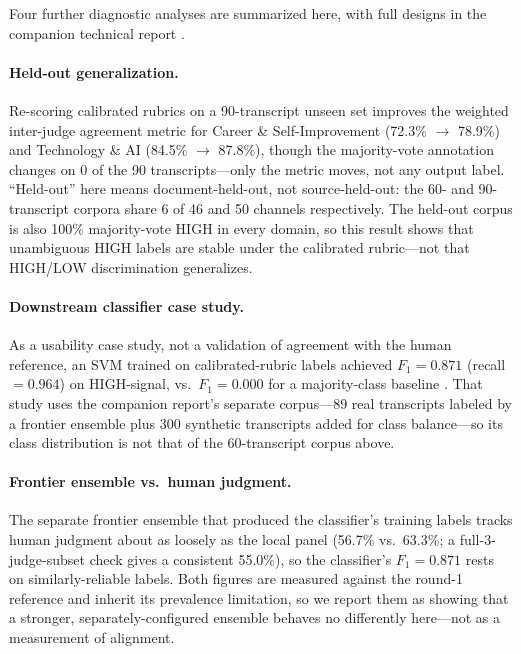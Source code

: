 \documentclass[letterpaper]{article}
\begin{document}
Four further diagnostic analyses are summarized here, with full designs in
the companion technical report \citep{das2026snr}.

\paragraph{Held-out generalization.}
Re-scoring calibrated rubrics on a 90-transcript unseen set improves the
weighted inter-judge agreement metric for Career \& Self-Improvement
(72.3\% $\rightarrow$ 78.9\%) and Technology \& AI
(84.5\% $\rightarrow$ 87.8\%), though the majority-vote annotation changes on
0 of the 90 transcripts---only the metric moves, not any output label.
``Held-out'' here means document-held-out, not source-held-out: the 60- and
90-transcript corpora share 6 of 46 and 50 channels respectively. The held-out
corpus is also 100\% majority-vote HIGH in every domain, so this result shows
that unambiguous HIGH labels are stable under the calibrated rubric---not that
HIGH/LOW discrimination generalizes.

\paragraph{Downstream classifier case study.}
As a usability case study, not a validation of agreement with the human
reference, an SVM trained on calibrated-rubric labels achieved
$F_1 = 0.871$ (recall $= 0.964$) on HIGH-signal, vs.\ $F_1 = 0.000$ for a
majority-class baseline \citep{das2026snr}. That study uses the companion
report's separate corpus---89 real transcripts labeled by a frontier ensemble
plus 300 synthetic transcripts added for class balance---so its class
distribution is not that of the 60-transcript corpus above.

\paragraph{Frontier ensemble vs.\ human judgment.}
The separate frontier ensemble that produced the classifier's training labels
tracks human judgment about as loosely as the local panel (56.7\% vs.\
63.3\%; a full-3-judge-subset check gives a consistent 55.0\%), so the classifier's $F_1 = 0.871$ rests on similarly-reliable labels. Both
figures are measured against the round-1 reference and inherit its prevalence
limitation, so we report them as showing that a stronger,
separately-configured ensemble behaves no differently here---not as a
measurement of alignment.
\end{document}
